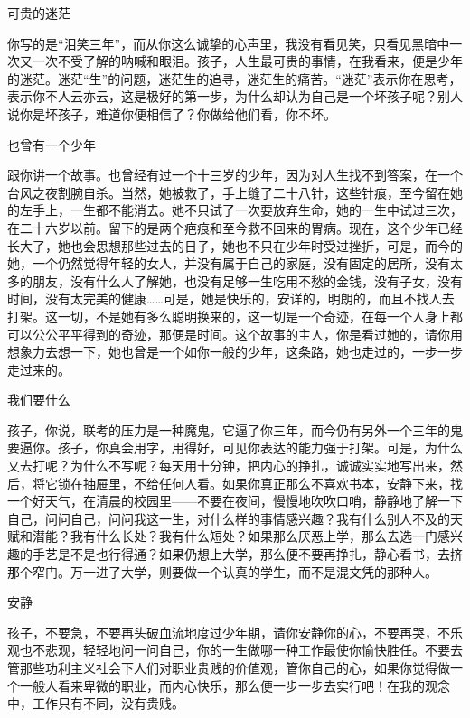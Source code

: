 \begin{center}
    \par 可贵的迷茫 
\end{center}
\par 你写的是“泪笑三年”，而从你这么诚挚的心声里，我没有看见笑，只看见黑暗中一次又一次不受了解的呐喊和眼泪。孩子，人生最可贵的事情，在我看来，便是少年的迷茫。迷茫“生”的问题，迷茫生的追寻，迷茫生的痛苦。“迷茫”表示你在思考，表示你不人云亦云，这是极好的第一步，为什么却认为自己是一个坏孩子呢？别人说你是坏孩子，难道你便相信了？你做给他们看，你不坏。
\begin{center}
    \par 也曾有一个少年
\end{center}
\par 跟你讲一个故事。也曾经有过一个十三岁的少年，因为对人生找不到答案，在一个台风之夜割腕自杀。当然，她被救了，手上缝了二十八针，这些针痕，至今留在她的左手上，一生都不能消去。她不只试了一次要放弃生命，她的一生中试过三次，在二十六岁以前。留下的是两个疤痕和至今救不回来的胃病。现在，这个少年已经长大了，她也会思想那些过去的日子，她也不只在少年时受过挫折，可是，而今的她，一个仍然觉得年轻的女人，并没有属于自己的家庭，没有固定的居所，没有太多的朋友，没有什么人了解她，也没有足够一生吃用不愁的金钱，没有子女，没有时间，没有太完美的健康……可是，她是快乐的，安详的，明朗的，而且不找人去打架。这一切，不是她有多么聪明换来的，这一切是一个奇迹，在每一个人身上都可以公公平平得到的奇迹，那便是时间。这个故事的主人，你是看过她的，请你用想象力去想一下，她也曾是一个如你一般的少年，这条路，她也走过的，一步一步走过来的。
\begin{center}
    \par 我们要什么  
\end{center}
\par 孩子，你说，联考的压力是一种魔鬼，它逼了你三年，而今仍有另外一个三年的鬼要逼你。孩子，你真会用字，用得好，可见你表达的能力强于打架。可是，为什么又去打呢？为什么不写呢？每天用十分钟，把内心的挣扎，诚诚实实地写出来，然后，将它锁在抽屉里，不给任何人看。如果你真正那么不喜欢书本，安静下来，找一个好天气，在清晨的校园里——不要在夜间，慢慢地吹吹口哨，静静地了解一下自己，问问自己，问问我这一生，对什么样的事情感兴趣？我有什么别人不及的天赋和潜能？我有什么长处？我有什么短处？如果那么厌恶上学，那么去选一门感兴趣的手艺是不是也行得通？如果仍想上大学，那么便不要再挣扎，静心看书，去挤那个窄门。万一进了大学，则要做一个认真的学生，而不是混文凭的那种人。
\begin{center}
    \par 安静 
\end{center}
\par 孩子，不要急，不要再头破血流地度过少年期，请你安静你的心，不要再哭，不乐观也不悲观，轻轻地问一问自己，你的一生做哪一种工作最使你愉快胜任。不要去管那些功利主义社会下人们对职业贵贱的价值观，管你自己的心，如果你觉得做一个一般人看来卑微的职业，而内心快乐，那么便一步一步去实行吧！在我的观念中，工作只有不同，没有贵贱。
